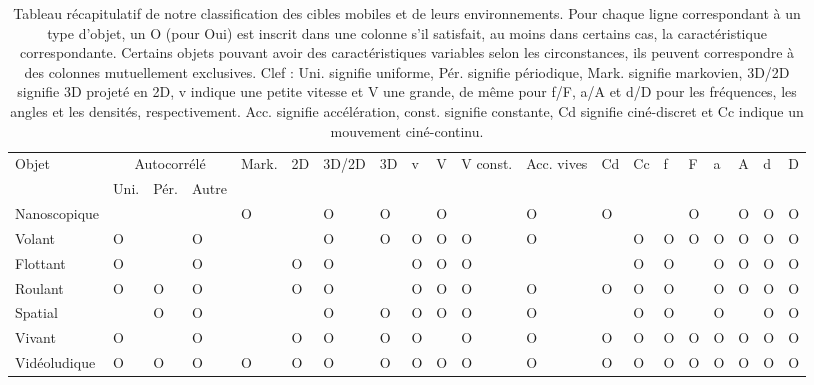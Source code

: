 	\begin{landscape}
	\begin{table}
		\centering
		\begin{adjustbox}{max width=\linewidth}
		\begin{tabular}{l|lll|l|l|l|l|l|l|l|l|l|l|l|l|l|l|l|l}
		Objet & \multicolumn{3}{c|}{Autocorrélé}                   & Mark. & 2D & 3D/2D & 3D & v & V & V const. & Acc. vives & Cd & Cc & f & F & a & A & d & D \\
    & Uni. & \multicolumn{1}{c}{Pér.} & Autre &         &    &       &    &   &   &          &            &           &           &   &   &   &   &   &  \bigstrut[b] \\ \hline
		Nanoscopique   &          &                                &       & O       &    & O     & O  &   & O &          & O          & O         &           &   & O &   & O & O & O \bigstrut[t] \\
		Volant         & O        &                                & O     &         &    & O     & O  & O & O & O        & O          &           & O         & O & O & O & O & O & O \\
		Flottant       & O        &                                & O     &         & O  & O     &    & O & O & O        &            &           & O         & O &   & O & O & O & O \\
		Roulant        & O        & O                              & O     &         & O  & O     &    & O & O & O        & O          & O         & O         & O &   & O & O & O & O \\
		Spatial        &          & O                              & O     &         &    & O     & O  & O & O & O        & O          &           & O         & O &   & O &   & O & O \\
		Vivant         & O        &                                & O     &         & O  & O     & O  & O &   & O        & O          & O         & O         & O & O & O & O & O & O \\
		Vidéoludique   & O        & O                              & O     & O       & O  & O     & O  & O & O & O        & O          & O         & O         & O & O & O & O & O & O
		\end{tabular}
		\end{adjustbox}
		\caption[Classification des cibles mobiles et environnement de sélection]{Tableau récapitulatif de notre classification des cibles mobiles et de leurs environnements. Pour chaque ligne correspondant à un type d'objet, un O (pour Oui) est inscrit dans une colonne s'il satisfait, au moins dans certains cas, la caractéristique correspondante. Certains objets pouvant avoir des caractéristiques variables selon les circonstances, ils peuvent correspondre à des colonnes mutuellement exclusives. Clef : Uni. signifie uniforme, Pér. signifie périodique, Mark. signifie markovien, 3D/2D signifie 3D projeté en 2D, v indique une petite vitesse et V une grande, de même pour f/F, a/A et d/D pour les fréquences, les angles et les densités, respectivement. Acc. signifie accélération, const. signifie constante, Cd signifie ciné-discret et Cc indique un mouvement ciné-continu.}
		\label{tab:recapSelEnvs}
	\end{table}


\end{landscape}
